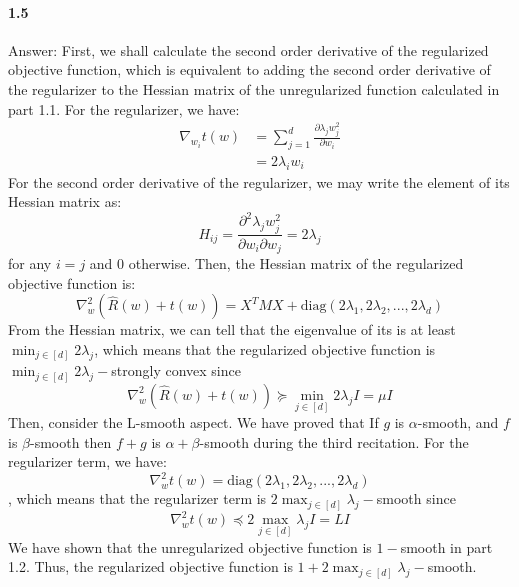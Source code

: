 \documentclass[11pt]{article}
\begin{document}
\paragraph{1.5}
Answer:
\newline
First, we shall calculate the second order derivative of the regularized objective function, which is equivalent to adding the second order derivative of the regularizer to the Hessian matrix of the unregularized function calculated in part 1.1.
For the regularizer, we have:
\begin{equation}
    \begin{split}
        \nabla_{w_i}t(w) &= \sum_{j=1}^d\frac{\partial\lambda_jw_j^2}{\partial w_i}\\
        &= 2\lambda_iw_i
    \end{split}
\end{equation}
For the second order derivative of the regularizer, we may write the element of its Hessian matrix as:
\begin{equation}
    H_{ij} = \frac{\partial^2\lambda_jw_j^2}{\partial w_i\partial w_j} = 2\lambda_j
\end{equation}
for any $i=j$ and $0$ otherwise.
Then, the Hessian matrix of the regularized objective function is:
\begin{equation}
    \nabla_w^2(\hat{R}(w)+t(w)) = X^TMX + \text{diag}(2\lambda_1,2\lambda_2,...,2\lambda_d)
\end{equation}
From the Hessian matrix, we can tell that the eigenvalue of its is at least $\min_{j\in [d]} 2\lambda_j$, which means that the regularized objective function is $\min_{j\in [d]} 2\lambda_j-$strongly convex since 
\begin{equation}
    \nabla_w^2(\hat{R}(w)+t(w)) \succeq \min_{j\in [d]} 2\lambda_j I = \mu I
\end{equation}
Then, consider the L-smooth aspect. We have proved that If $g$ is $\alpha$-smooth, and $f$ is $\beta$-smooth then $f+g$ is $\alpha+\beta$-smooth during the third recitation.
For the regularizer term, we have:
\begin{equation}
    \nabla_w^2t(w) = \text{diag}(2\lambda_1,2\lambda_2,...,2\lambda_d)
\end{equation}
, which means that the regularizer term is $2\max_{j\in [d]}\lambda_j-$smooth since
\begin{equation}
    \nabla_w^2t(w) \preceq 2\max_{j\in [d]}\lambda_j I = L I
\end{equation}
We have shown that the unregularized objective function is $1-$smooth in part 1.2. Thus, the regularized objective function is $1+2\max_{j\in [d]}\lambda_j-$smooth.
\end{document}
